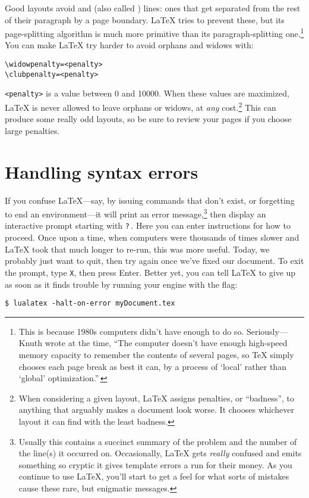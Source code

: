 Good layouts avoid  and 
(also called ) lines:
ones that get separated from the rest of their paragraph by a page boundary.
\LaTeX{} tries to prevent these, but its page-splitting algorithm
is much more primitive than its paragraph-splitting one.\punckern\footnote{%
This is because 1980s computers didn't have enough  to do so.
Seriously---Knuth wrote at the time,
``The computer doesn't have enough high-speed memory capacity to remember the
contents of several pages,
so \TeX{} simply chooses each page break as best it can, by a process of
`local' rather than `global' optimization.\quotekern''\,}
You can make \LaTeX{} try harder to avoid orphans and widows with:
\begin{leftfigure}
\begin{lstlisting}
\widowpenalty=<penalty>
\clubpenalty=<penalty>
\end{lstlisting}
\end{leftfigure}
\verb|<penalty>| is a value between 0 and 10000.
When these values are maximized,
\LaTeX{} is never allowed to leave orphans or widows,
at \emph{any} cost.\punckern\footnote{When considering a given layout,
\LaTeX{} assigns penalties, or ``badness''\quotekern,
to anything that arguably makes a document look worse.
It chooses whichever layout it can find with the least badness.}
This can produce some really odd layouts,
so be sure to review your pages if you choose large penalties.

\section{Handling syntax errors}
If you confuse \LaTeX{}---say, by issuing commands that don't exist,
or forgetting to end an environment---it will print an
error message,\punckern\footnote{Usually this contains a succinct summary of
the problem and the number of the line(s) it occurred on. Occasionally,
\LaTeX{} gets \emph{really} confused and emits something so cryptic it gives
\cpp{} template errors a run for their money.
As you continue to use \LaTeX, you'll start to get a feel for what sorts of
mistakes cause these rare, but enigmatic messages.}
then display an interactive prompt starting with \texttt{?}\,.
Here you can enter instructions for how to proceed.
Once upon a time, when computers were thousands of times slower and
\LaTeX{} took that much longer to re-run, this was more useful.
Today, we probably just want to quit,
then try again once we've fixed our document.
To exit the prompt, type \texttt{X}, then press Enter.
Better yet, you can tell \LaTeX{} to give up as soon as it finds trouble
by running your engine with the  flag:
\begin{leftfigure}
\begin{lstlisting}
$ lualatex -halt-on-error myDocument.tex
\end{lstlisting}
\end{leftfigure}
